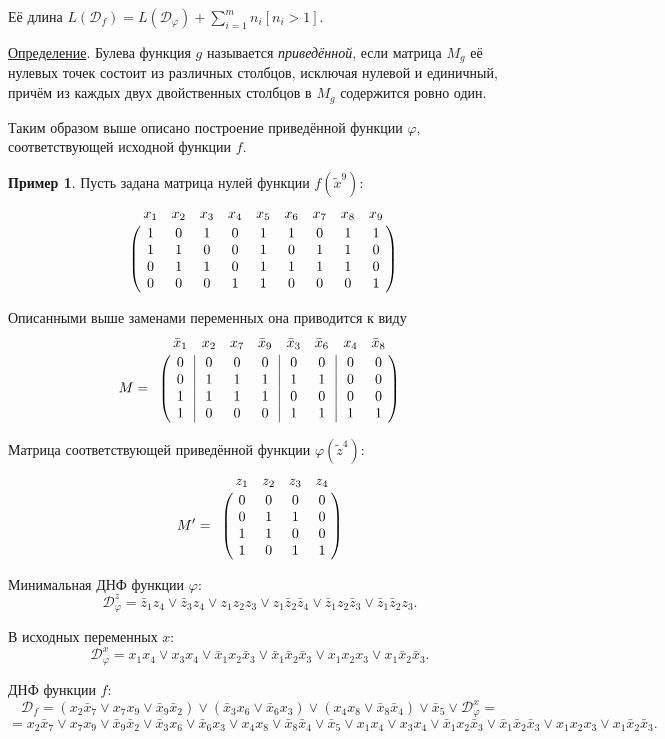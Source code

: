 \documentclass[12pt,a4paper,oneside,fleqn,leqno]{article}
\theoremstyle{definition}
\newtheorem{example}{Пример}%
\def\VR{\kern-\arraycolsep\strut\vrule &\kern-\arraycolsep}
\def\vr{\kern-\arraycolsep & \kern-\arraycolsep}
\begin{document}
			Её длина $L(\mathcal{D}_f) = L(\mathcal{D}_{\varphi}) + \sum\limits_{i = 1}^m n_i[n_i > 1].$\par
			\underline{Определение}. Булева функция $g$ называется {\it приведённой}, если матрица $M_g$ её нулевых точек состоит из различных столбцов, исключая нулевой и единичный, причём из каждых двух двойственных столбцов в $M_g$ содержится ровно один.\par
			Таким образом выше описано построение приведённой функции $\varphi,$ соответствующей исходной функции $f.$
			\begin{example}
				Пусть задана матрица нулей функции $f(\tilde x^9)$:
				$$
					\bordermatrix{
						& x_1& x_2 & x_3 & x_4 & x_5 & x_6 & x_7 & x_8 & x_9\cr
						&1 &0 &1 &0& 1& 1& 0& 1& 1\cr
						&1 &1& 0& 0& 1& 0& 1& 1& 0\cr
						&0 &1 &1& 0& 1& 1& 1& 1& 0\cr
						&0 &0 &0 &1& 1& 0& 0& 0& 1
					}
				$$\par
				Описанными выше заменами переменных она приводится к виду
				$$
					M = \bordermatrix{
						& \bar{x}_1& \vr x_2 & x_7 & \bar{x}_9 & \vr \bar{x}_3 & \bar{x}_6 & \vr x_4 & \bar{x}_8\cr
						&0 & \VR 0 &0 &0 & \VR 0& 0& \VR 0& 0\cr
						&0 & \VR 1 &1 &1 & \VR 1& 1& \VR 0& 0\cr
						&1 & \VR 1 &1 &1 & \VR 0& 0& \VR 0& 0\cr
						&1 & \VR 0 &0 &0 & \VR 1& 1& \VR 1& 1
					}
				$$\par
				Матрица соответствующей приведённой функции $\varphi(\tilde z^4)$:
				$$
					M' = \bordermatrix{
						& z_1& z_2 & z_3 & z_4\cr
						&0 &0 &0 &0\cr
						&0 &1 &1 & 0\cr
						&1 &1 &0 & 0\cr
						&1 &0 &1 &1
					}
				$$\par
				Минимальная ДНФ функции $\varphi$:
				$$
					\mathcal{D}_{\varphi}^z = \bar{z}_1z_4 \vee \bar{z}_3z_4 \vee z_1z_2z_3 \vee z_1\bar{z}_2\bar{z}_4 \vee \bar{z}_1z_2\bar{z}_3 \vee \bar{z}_1\bar{z}_2z_3.
				$$\par
				В исходных переменных $x$:
				$$
					\mathcal{D}_{\varphi}^x = x_1x_4 \vee x_3x_4 \vee \bar{x}_1x_2\bar{x}_3 \vee \bar{x}_1\bar{x}_2\bar{x}_3 \vee x_1x_2x_3 \vee x_1\bar{x}_2\bar{x}_3.
				$$\par
				ДНФ функции $f$:
				$$
					\mathcal{D}_f = (x_2\bar{x}_7 \vee x_7x_9 \vee \bar{x}_9\bar{x}_2) \vee (\bar{x}_3x_6 \vee \bar{x}_6x_3) \vee (x_4x_8 \vee \bar{x}_8\bar{x}_4) \vee \bar{x}_5 \vee \mathcal{D}_{\varphi}^x = $$ $$
					= x_2\bar{x}_7 \vee x_7x_9 \vee \bar{x}_9\bar{x}_2 \vee \bar{x}_3x_6 \vee \bar{x}_6x_3 \vee x_4x_8 \vee \bar{x}_8\bar{x}_4 \vee \bar{x}_5 \vee x_1x_4 \vee x_3x_4 \vee \bar{x}_1x_2\bar{x}_3 \vee \bar{x}_1\bar{x}_2\bar{x}_3 \vee x_1x_2x_3 \vee x_1\bar{x}_2\bar{x}_3.
				$$
			\end{example}
\end{document}
